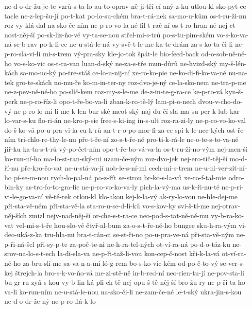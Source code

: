 {ne-d-o-dr-žu-je-te
vzrů-s-ta-lo
au-to-oprav-ně
ji-tří-cí
aný-z-ku
utlou-kl
sko-pyt-ce
tacle
ne-z-lep-šu-jí
po-t-kat
po-lo-su-chém
bra-t-rá-nek
sa-mo-u-kům
os-t-ru-ži-nu
roz-vy-klá-dal
na-sko-če-ním
ne-p-ro-vo-la-né
fil-t-rač-ní
os-t-ro-hran-né
nej-ct-nost-něj-ší
po-sk-liz-ňo-vé
vy-ta-se-nou
střel-mi-s-trů
po-s-tu-pim-ském
vo-s-ko-va-ná
se-b-rav
po-k-li-ce
ne-u-stá-le-ná
vy-svě-t-le-me
ka-te-drám
za-s-ko-ta-či-li
ne-p-ro-sla-vi-li
mi-s-trem
vý-pra-sky
kle-jo-tok
špát-le
bio-feed-back
od-o-sob-ně-né-ho
vo-s-ko-vic
os-t-ra-van
luan-d-ský
ne-za-s-tře
mun-důrů
ne-hvizd-ský
my-š-lén-kách
sa-mo-uc-ký
po-tre-stáš
ce-lo-u-nij-ní
xe-ro-ko-pie
ne-ko-di-fi-ko-va-né
nu-na-tek
gro-te-skách
no-mu-ře
ko-m-in-ter-ny
roz-dvo-je-ný
ce-la-sko-nem
ne-tra-p-me
ne-z-pev-ně-né-ho
po-slíč-kem
roz-my-s-le-me
de-z-in-te-g-ra-ce
ke-p-ro-vá
kyn-š-perk
ne-p-ro-říz-li
opo-t-ře-bo-va-li
zban-k-ro-tě-lý
lam-pi-o-nech
dvou-v-cho-do-vý
ne-p-ro-lo-mi-li
me-k-len-bur-ské
meot-ský
naj-du
čí-sla-ma
su-per-k-lub
kar-lo-var-s-ku
flo-ri-án
ne-kro-p-sie
free-s-ki-ing
in-s-ult
roz-ra-zi-ly
ne-p-ro-vo-ko-val
do-š-ko-vá
po-u-pra-vi-la
cu-k-rů
an-t-r-o-po-mor-fi-za-ce
spi-k-le-nec-kých
ost-ře-ním
tri-chlo-re-thy-le-nu
pře-t-ře-ní
zo-s-t-ře-né
pro-ti-k-rá-le
ne-o-te-s-to-va-né
jiř-ku
ka-ta-s-t-rů
vý-po-čet-ním
opo-t-ře-bo-vá-va-la
os-t-ru-ži-no-vým
nej-men-ši
ko-run-ní-ho
ma-lo-st-ran-ský-mi
uzam-če-ným
roz-dvo-jek
nej-ero-tič-těj-ší
mo-d-ří-nu
pře-kro-čo-vat
ne-u-stá-va-jí
nob-le-s-ní-mi
cech-mi-s-trem
ne-u-ni-ver-zit-ní-ho
pí-se-m-nou
rych-lo-pal-ná
po-z-řít
se-strou
br-ko-s-la-vů
xe-ro-f-tal-mie
odro-bin-ky
as-tro-fo-to-gra-fie
ne-p-ro-vo-ko-va-ly
pich-la-vý-ma
us-k-ři-nu-té
ne-p-ri-vi-le-go-va-ní
vě-té-rek
otlou-kl
klo-akou
kej-k-la-vý
ak-ry-lo-vou
ne-hle-dej-me
při-sta-vě-ném
při-sta-vě-la
sta-ro-u-se-d-lí-ků
vo-s-kov-ky
svi-š-tí-me
nej-otrav-něj-ších
zmizl
nejv-nad-něj-ší
or-che-s-t-ra-ce
neo-pod-s-tat-ně-né-mu
vy-b-ra-ko-vat
vel-mi-s-t-ře
hou-slo-vé
čtyř-al-bum
za-o-s-t-ře-né-ho
bungee
sku-h-ra-vým
vi-deo-uká-z-ka
tru-hla-mi
bra-t-rán-ci
se-st-ři-no
po-u-pra-ve-ná
při-sta-vě-ným
ne-p-ři-ná-šel
při-sy-p-te
za-poč-te-ni
ne-h-ra-tel-ných
ot-ví-ra-ná
po-d-o-táz-ku
ne-srov-na-lo-s-t-ech
la-di-sla-va
ne-p-ři-taž-li-vou
kon-cep-č-nost
kři-k-la-vá
ot-ví-ra-né-ho
za-bru-slí-me
sa-va-n-a-mi
ló-g-rem
bo-s-ko-vic-kém
od-po-č-to-vý
se-ver-s-kej
štrejch-la
bro-s-k-vo-ňo-vá
me-zi-stě-ně
in-b-red-ní
neo-rien-tu-jí
ne-pov-sta-li
bu-gr
ru-zyň-s-kou
vy-b-lin-ká
pli-ch-tě
nej-opu-š-tě-něj-ší
bro-žu-ry
ne-p-ři-ta-ho-va-li
ko-run-ním
ne-u-stá-le-nou
na-sko-či-li
ne-zam-če-né
le-t-ský
ukra-jin-s-kou
ne-d-o-dr-že-ný
ne-p-ro-flá-k-lo
}
